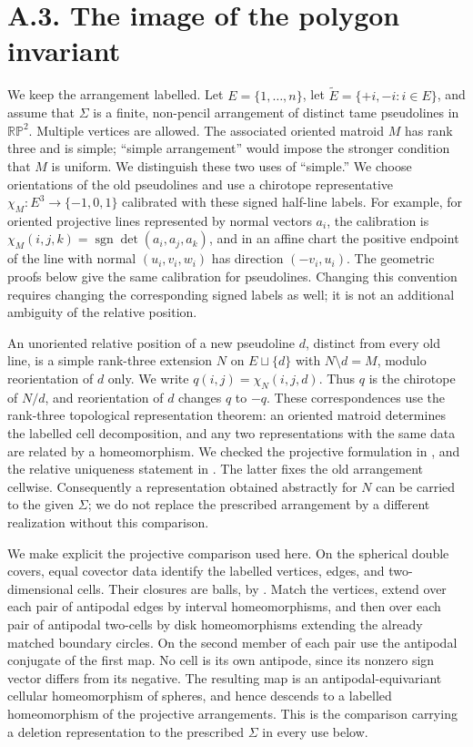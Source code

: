 \documentclass[11pt,a4paper]{article}
\begin{document}
\section{A.3. The image of the polygon invariant}
\label{sec:A3}

We keep the arrangement labelled.  Let $E=\{1,\ldots,n\}$, let
$\widetilde E=\{+i,-i:i\in E\}$, and assume that $\Sigma$ is a finite,
non-pencil arrangement of distinct tame pseudolines in $\mathbb {RP}^{2}$.
Multiple vertices are allowed.  The associated oriented matroid $M$ has
rank three and is simple; ``simple arrangement'' would impose the stronger
condition that $M$ is uniform.  We distinguish these two uses of
``simple.''  We choose orientations of the old pseudolines and use a
chirotope representative $\chi_M:E^3\longrightarrow\{-1,0,1\}$
calibrated with these signed half-line labels.  For example, for oriented
projective lines represented by normal vectors $a_i$, the calibration is
$\chi_M(i,j,k)=\operatorname{sgn}\det(a_i,a_j,a_k)$, and in an affine
chart the positive endpoint of the line with normal $(u_i,v_i,w_i)$ has
direction $(-v_i,u_i)$.  The geometric proofs below give the same
calibration for pseudolines.  Changing this convention requires changing
the corresponding signed labels as well; it is not an additional
ambiguity of the relative position.

An unoriented relative position of a new pseudoline $d$, distinct from
every old line, is a simple rank-three extension $N$ on $E\sqcup\{d\}$
with $N\setminus d=M$, modulo reorientation of $d$ only.  We write
$q(i,j)=\chi_N(i,j,d)$.  Thus $q$ is the chirotope of $N/d$, and
reorientation of $d$ changes $q$ to $-q$.  These correspondences use the
rank-three topological representation theorem: an oriented matroid
determines the labelled cell decomposition, and any two representations
with the same data are related by a homeomorphism.  We checked the
projective formulation in \cite[\S7.1.4, pp.~6--7]{RGZpreprint}, and the
relative uniqueness statement in \cite[Theorems~4--5, pp.~15,18--20]{BKMS2002}.
The latter fixes the old arrangement cellwise.  Consequently a
representation obtained abstractly for $N$ can be carried to the given
$\Sigma$; we do not replace the prescribed arrangement by a different
realization without this comparison.

We make explicit the projective comparison used here.  On the
spherical double covers, equal covector data identify the labelled
vertices, edges, and two-dimensional cells.  Their closures are
balls, by \cite[Theorem~2, pp.~10--11]{BKMS2002}.  Match the vertices,
extend over each pair of antipodal edges by interval homeomorphisms,
and then over each pair of antipodal two-cells by disk
homeomorphisms extending the already matched boundary circles.
On the second member of each pair use the antipodal conjugate of
the first map.  No cell is its own antipode, since its nonzero sign
vector differs from its negative.  The resulting map is an
antipodal-equivariant cellular homeomorphism of spheres, and hence
descends to a labelled homeomorphism of the projective arrangements.
This is the comparison carrying a deletion representation to the
prescribed $\Sigma$ in every use below.
\end{document}
